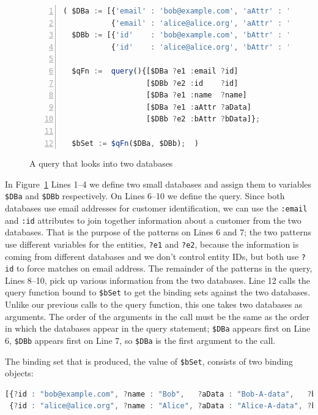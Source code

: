 \documentclass[9pt,letterpaper]{article}
\newcommand{\stt}[1]{\texttt{#1}} %
\begin{document}
\begin{figure}[H]
    \caption{A query that looks into two databases}
    \label{code:two-database-query}
\begin{lstlisting}[language=JavaScript,numberstyle=\scriptsize,basicstyle=\ttfamily\scriptsize,numbers=left,stepnumber=1,breaklines=true]
( $DBa := [{'email' : 'bob@example.com', 'aAttr' : 'Bob-A-data',   'name' : 'Bob'},
           {'email' : 'alice@alice.org', 'aAttr' : 'Alice-A-data', 'name' : 'Alice'}];
  $DBb := [{'id'    : 'bob@example.com', 'bAttr' : 'Bob-B-data'},
           {'id'    : 'alice@alice.org', 'bAttr' : 'Alice-B-data'}];

  $qFn :=  query(){[$DBa ?e1 :email ?id]
                   [$DBb ?e2 :id    ?id]
                   [$DBa ?e1 :name  ?name]
                   [$DBa ?e1 :aAttr ?aData]
                   [$DBb ?e2 :bAttr ?bData]};

  $bSet := $qFn($DBa, $DBb);  )
\end{lstlisting}
  \end{figure} \vspace{-2em}

  In Figure~\ref{code:two-database-query} Lines 1--4 we define two small databases and assign them to variables \stt{\$DBa} and \stt{\$DBb} respectively. On Lines 6--10 we define the query.
Since both databases use email addresses for customer identification, we can use the \stt{:email} and \stt{:id} attributes to join together information about a customer from the two databases.
That is the purpose of the patterns on Lines 6 and 7; the two patterns use different variables for the entities, \stt{?e1} and \stt{?e2},
because the information is coming from different databases and we don't control entity IDs, but both use \stt{?id} to force
matches on email address.
The remainder of the patterns in the query, Lines 8--10, pick up various information from the two databases.
Line 12 calls the query function bound to \stt{\$bSet} to get the binding sets against the two databases.
Unlike our previous calls to the query function, this one takes two databases as arguments.
The order of the arguments in the call must be the same as the order in which the databases appear in the query statement;
\stt{\$DBa} appears first on Line 6, \stt{\$DBb} appears first on Line 7, so \stt{\$DBa} is the first argument to the call.

The binding set that is produced, the value of \stt{\$bSet}, consists of two binding objects:

\begin{lstlisting}[language=JavaScript,numbers=none,basicstyle=\ttfamily\scriptsize]
[{?id : "bob@example.com", ?name : "Bob",   ?aData : "Bob-A-data",   ?bData : "Bob-B-data"  },
 {?id : "alice@alice.org", ?name : "Alice", ?aData : "Alice-A-data", ?bData : "Alice-B-data"}]
\end{lstlisting} \vspace{-2em}
\end{document}
